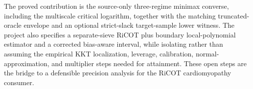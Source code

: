 The proved contribution is the source-only three-regime minimax converse, including the multiscale critical logarithm, together with the matching truncated-oracle envelope and an optional strict-slack target-sample lower witness. The project also specifies a separate-sieve RiCOT plus boundary local-polynomial estimator and a corrected bias-aware interval, while isolating rather than assuming the empirical KKT localization, leverage, calibration, normal-approximation, and multiplier steps needed for attainment. These open steps are the bridge to a defensible precision analysis for the RiCOT cardiomyopathy consumer.